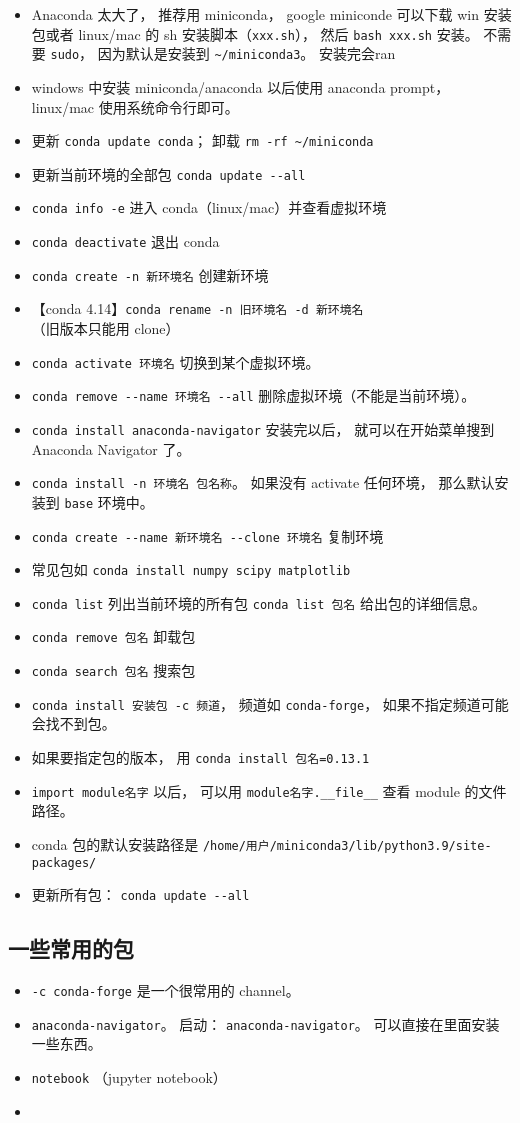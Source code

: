 
\begin{itemize}
\item Anaconda 太大了， 推荐用 miniconda， google miniconde 可以下载 win 安装包或者 linux/mac 的 sh 安装脚本（\verb`xxx.sh`）， 然后 \verb`bash xxx.sh` 安装。 不需要 \verb`sudo`， 因为默认是安装到 \verb`~/miniconda3`。 安装完会ran
\item windows 中安装 miniconda/anaconda 以后使用 anaconda prompt， linux/mac 使用系统命令行即可。
\item 更新 \verb`conda update conda`； 卸载 \verb`rm -rf ~/miniconda`
\item 更新当前环境的全部包 \verb`conda update --all`
\item \verb`conda info -e` 进入 conda（linux/mac）并查看虚拟环境
\item \verb`conda deactivate` 退出 conda
\item \verb`conda create -n 新环境名` 创建新环境
\item 【conda 4.14】\verb`conda rename -n 旧环境名 -d 新环境名` （旧版本只能用 clone）
\item \verb`conda activate 环境名` 切换到某个虚拟环境。
\item \verb`conda remove --name 环境名 --all` 删除虚拟环境（不能是当前环境）。
\item \verb`conda install anaconda-navigator` 安装完以后， 就可以在开始菜单搜到 Anaconda Navigator 了。
\item \verb`conda install -n 环境名 包名称`。 如果没有 activate 任何环境， 那么默认安装到 \verb`base` 环境中。
\item \verb`conda create --name 新环境名 --clone 环境名` 复制环境
\item 常见包如 \verb`conda install numpy scipy matplotlib`
\item \verb`conda list` 列出当前环境的所有包 \verb`conda list 包名` 给出包的详细信息。
\item \verb`conda remove 包名` 卸载包
\item \verb`conda search 包名` 搜索包
\item \verb`conda install 安装包 -c 频道`， 频道如 \verb`conda-forge`， 如果不指定频道可能会找不到包。
\item 如果要指定包的版本， 用 \verb`conda install 包名=0.13.1`
\item \verb`import module名字` 以后， 可以用 \verb`module名字.__file__` 查看 module 的文件路径。
\item conda 包的默认安装路径是 \verb`/home/用户/miniconda3/lib/python3.9/site-packages/`
\item 更新所有包： \verb`conda update --all`
\end{itemize}

\subsection{一些常用的包}
\begin{itemize}
\item \verb`-c conda-forge` 是一个很常用的 channel。
\item \verb`anaconda-navigator`。 启动： \verb`anaconda-navigator`。 可以直接在里面安装一些东西。
\item \verb`notebook` （jupyter notebook）
\item 
\end{itemize}
